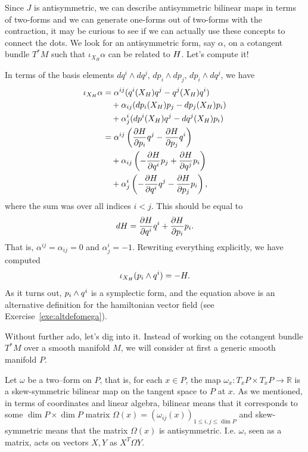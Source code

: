 \documentclass[english,fontsize=11pt,paper=a5,oneside]{scrbook}
\newcommand{\R}{\mathbb{R}}
\let\d\relax
\newcommand{\d}{\mathrm{d}}
\theoremstyle{definition}
\begin{document}
Since $J$ is antisymmetric, we can describe antisymmetric bilinear maps in terms of two-forms and we can generate one-forms out of two-forms with the contraction, it may be curious to see if we can actually use these concepts to connect the dots.
We look for an antisymmetric form, say $\alpha$, on a cotangent bundle $T^*M$ such that $\iota_{X_H} \alpha$ can be related to $\d H$. Let's compute it!

In terms of the basis elements $dq^i\wedge dq^j$, $dp_i\wedge dp_j$, $dp_i\wedge dq^j$, we have
\begin{align}
  \iota_{X_H} \alpha &= \alpha^{ij} (\d q^i(X_H) \d q^j - \d q^j(X_H) \d q^i) \\
                     &\quad + \alpha_{ij} (dp_i(X_H) \d p_j - dp_j(X_H) \d p_i) \\
                     &\quad + \alpha^i_j( dp^i(X_H) \d q^j - dq^j(X_H) \d p_i) \\
                     &= \alpha^{ij}\left(\frac{\partial H}{\partial p_i} \d q^j - \frac{\partial H}{\partial p_j}\d q^i\right) \\
                     &\quad + \alpha_{ij}\left(-\frac{\partial H}{\partial q^i}  \d p_j + \frac{\partial H}{\partial q^j}  \d p_i\right) \\
                     &\quad + \alpha^i_j\left(-\frac{\partial H}{\partial q^i} \d q^j - \frac{\partial H}{\partial p_j} \d p_i\right),
\end{align}
where the sum was over all indices $i<j$. This should be equal to
\begin{equation}
  dH = \frac{\partial H}{\partial q^i} \d q^i + \frac{\partial H}{\partial p_i} \d p_i.
\end{equation}
That is, $\alpha^{ij}=\alpha_{ij} = 0$ and $\alpha^i_j = -1$.
Rewriting everything explicitly, we have computed
\begin{equation}
 \iota_{X_H}(\d p_i\wedge \d q^i) = - \d H.
\end{equation}
As it turns out, $\d p_i \wedge \d q^i$ is a symplectic form, and the equation above is an alternative definition for the hamiltonian vector field (see Exercise~\ref{exe:altdefomega}).

Without further ado, let's dig into it. Instead of working on the cotangent bundle $T^*M$ over a smooth manifold $M$, we will consider at first a generic smooth manifold $P$.

Let $\omega$ be a two--form on $P$, that is, for each $x\in P$, the map $\omega_x: T_x P \times T_x P \to \R$ is a skew-symmetric bilinear map on the tangent space to $P$ at $x$. As we mentioned, in terms of coordinates and linear algebra, bilinear means that it corresponds to some $\dim P\times \dim P$ matrix $\Omega(x) = \left(\omega_{ij}(x)\right)_{1\leq i,j\leq \dim P}$ and skew-symmetric means that the matrix $\Omega(x)$ is antisymmetric. I.e. $\omega$, seen as a matrix, acts on vectors $X,Y$ as $X^T \Omega Y$.
\end{document}
